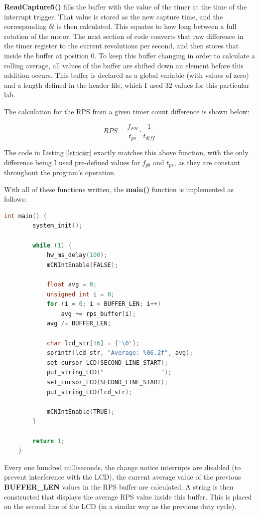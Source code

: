 \documentclass[a4paper, 12pt]{article}
\begin{document}
\textbf{ReadCapture5()} fills the buffer with the value of the timer at the time of the interrupt trigger. That value is stored as the new capture time, and the corresponding $\delta t$ is then calculated. This equates to how long between a full rotation of the motor. The next section of code converts that raw difference in the timer register to the current revolutions per second, and then stores that inside the buffer at position 0. To keep this buffer changing in order to calculate a rolling average, all values of the buffer are shifted down an element before this addition occurs. This buffer is declared as a global variable (with values of zero) and a length defined in the header file, which I used 32 values for this particular lab.

The calculation for the RPS from a given timer count difference is shown below:

$$RPS=\frac{f_{PB}}{t_{ps}}\cdot \frac{1}{t_{diff}}$$

The code in Listing \ref{lst:icisr} exactly matches this above function, with the only difference being I used pre-defined values for $f_{pb}$ and $t_{ps}$, as they are constant throughout the program's operation.

With all of these functions written, the \textbf{main()} function is implemented as follows:

	\begin{mdframed}[backgroundcolor=code-gray, roundcorner=10pt,
								innerleftmargin=5, innertopmargin=5, innerbottommargin=5]	
	\begin{lstlisting}[language=C, caption=Main Program Loop, tabsize=2, label={lst:main}]
	int main() {
		system_init();

		while (1) {
			hw_ms_delay(100);
			mCNIntEnable(FALSE);
		
			float avg = 0;
			unsigned int i = 0;
			for (i = 0; i < BUFFER_LEN; i++)
				avg += rps_buffer[i];
			avg /= BUFFER_LEN;

			char lcd_str[16] = {'\0'};
			sprintf(lcd_str, "Average: %06.2f", avg);
			set_cursor_LCD(SECOND_LINE_START);
			put_string_LCD("				");
			set_cursor_LCD(SECOND_LINE_START);
			put_string_LCD(lcd_str);
	
			mCNIntEnable(TRUE);
		}

		return 1;
	}
	\end{lstlisting}
	\end{mdframed}
	
Every one hundred milliseconds, the change notice interrupts are disabled (to prevent interference with the LCD), the current average value of the previous \textbf{BUFFER\_LEN} values in the RPS buffer are calculated. A string is then constructed that displays the average RPS value inside this buffer. This is placed on the second line of the LCD (in a similar way as the previous duty cycle).
\end{document}
